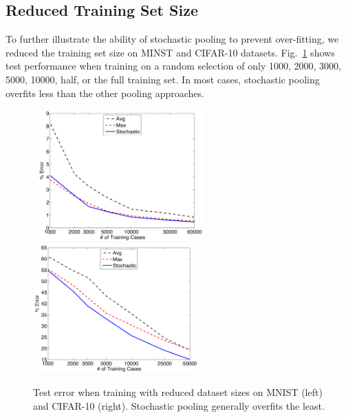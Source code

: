 \documentclass{article} %
\newcommand{\fig}[1]{Fig.~\ref{fig:#1}}
\begin{document}
\subsection{Reduced Training Set Size}
\vspace{-1mm}
To further illustrate the ability of stochastic pooling to prevent
over-fitting, we reduced the training set size on MINST and CIFAR-10
datasets. \fig{reduced} shows test performance when training on a
random selection of only 1000, 2000, 3000, 5000, 10000, half, or the
full training set. In most cases, stochastic pooling overfits less than the other pooling
approaches.

\begin{figure}[h!]
\vspace*{-0.4cm}
\begin{center}
\mbox{
\includegraphics[width=2.5in]{MNIST_reduced.pdf}
\includegraphics[width=2.5in]{CIFAR_reduced.pdf}}
\end{center}
\vspace*{-0.6cm}
\caption{Test error when training with reduced dataset sizes on MNIST (left) and
  CIFAR-10 (right). Stochastic pooling generally overfits the least. }
\label{fig:reduced}
\vspace*{-0.4cm}
\end{figure}
\end{document}

